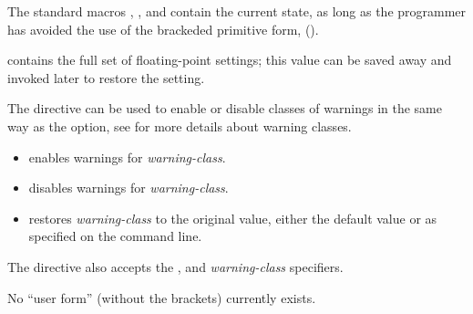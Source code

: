The standard macros ,
, and  contain
the current state, as long as the programmer has avoided the use
of the brackeded primitive form, (\code{[FLOAT]}).

 contains the full set of floating-point settings;
this value can be saved away and invoked later to restore the setting.


The \code{[WARNING]} directive can be used to enable or disable classes
of warnings in the same way as the  option, see 
for more details about warning classes.

\begin{itemize}
    \item{ enables warnings for
        \emph{warning-class}}.

    \item{ disables warnings for
        \emph{warning-class}}.

    \item{ restores \emph{warning-class} to
        the original value, either the default value or as specified on the
            command line.}
\end{itemize}
The \code{[WARNING]} directive also accepts the ,  and
\emph{warning-class} specifiers.

No ``user form'' (without the brackets) currently exists.
